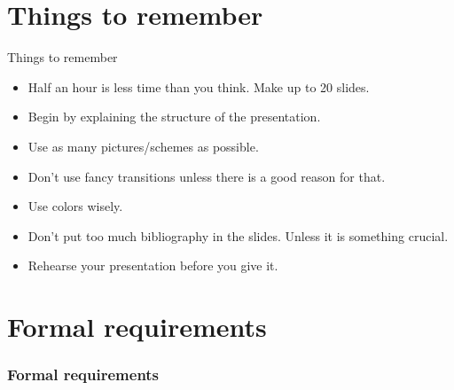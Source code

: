 \documentclass{beamer}
\begin{document}
\section[Things to remember]{Things to remember}
\begin{frame}{Things to remember}
    \begin{itemize}
     \item Half an hour is less time than you think. \alert{Make up to 20 slides}.
     \item Begin by explaining the structure of the presentation.
     \item \alert{Use as many pictures/schemes as possible}.
     \item Don't use fancy transitions unless there is a good reason for that.
     \item Use colors wisely.
     \item Don't put too much bibliography in the slides. Unless it is something crucial.
     \item Rehearse your presentation before you give it.
    \end{itemize}
\end{frame}
    
\section[Formal requirements]{Formal requirements}
\begin{frame}
        \frametitle{Formal requirements}
    \end{frame}
\end{document}
